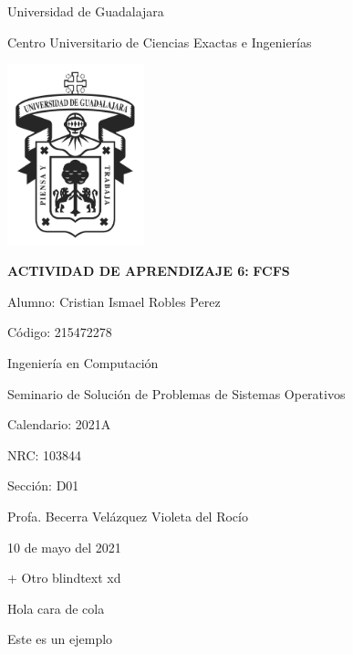 \documentclass[12pt, oneside]{article}
\title{\tiText}
\newcommand{\code}{215472278}
\newcommand{\calendar}{2021A}
\newcommand{\nrc}{103844}
\newcommand{\signSec}{D01}
\newcommand{\profName}{Profa. Becerra Velázquez Violeta del Rocío}
\newcommand{\actTitle}{FCFS}
\newcommand{\actNum}{ACTIVIDAD DE APRENDIZAJE 6: }
\newcommand{\myName}{Cristian Ismael Robles Perez}
\newcommand{\sign}{Seminario de Solución de Problemas de Sistemas Operativos}
\begin{document}

\begingroup
    \fontsize{18pt}{22pt}\selectfont
    \begin{center}
        Universidad de Guadalajara

        Centro Universitario de Ciencias Exactas e Ingenierías \newline

        \includegraphics[width=150px]{imgs/logo_udg.png} \break

        \textbf{\actNum}
        \textbf{\actTitle} \newline
    \end{center}
\endgroup

\begingroup
    \fontsize{16pt}{18pt}\selectfont
        Alumno: \myName

        Código: \code \newline

        Ingeniería en Computación

        \sign

        Calendario: \calendar

        NRC: \nrc

        Sección: \signSec

        \profName

        \begin{flushright}
            10 de mayo del 2021
        \end{flushright}
\endgroup


\newpage

\blindtext
\blindtext
\blindtext
\newpage

\blindtext
\blindtext
\blindtext
\blindtext
\blindtext
\blindtext
\blindtext

\blindtext
\blindtext

\blindtext

\blindtext
+
Otro blindtext xd

\blindtext

Hola cara de cola

\blindtext

Este es un ejemplo

\blindtext
\end{document}
